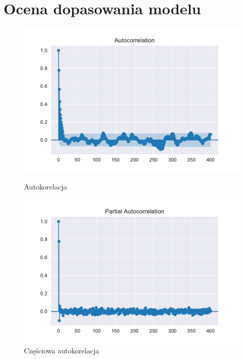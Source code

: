 \documentclass{article}
\theoremstyle{break}
\begin{document}
	\section{Ocena dopasowania modelu}
	\begin{figure}[H]
		\begin{center}
			\begin{minipage}{0.49\linewidth}
				\centering
				\includegraphics[scale=0.49]{acf2.pdf}
				\caption{Autokorelacja}
				\label{fig:acf2}
			\end{minipage}
			\begin{minipage}{0.49\linewidth}
				\centering
				\includegraphics[scale=0.49]{pacf2.pdf}
				\caption{Częściowa autokorelacja}
				\label{fig:pacf2}
			\end{minipage}
		\end{center}
	\end{figure}
	
\end{document}
